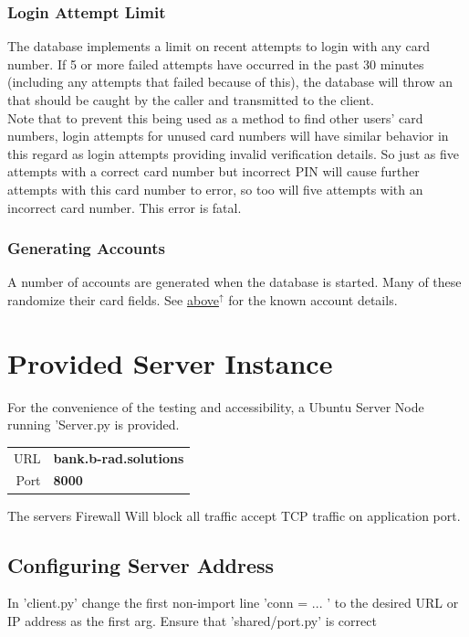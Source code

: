 \documentclass{article}
\newcommand{\code}[1]{\tcbox[
    on line,
    colback=codebackground, boxsep=2pt,
    colframe=white, boxrule=0pt,
    top=0pt, bottom=0pt, left=0pt, right=0pt
]{\texttt{#1}}}
\begin{document}
\subsubsection{Login Attempt Limit}
\label{sec:CardLoginAttemptLimit}
The database implements a limit on recent attempts to login with any card number.
If 5 or more failed attempts have occurred in the past 30 minutes (including any attempts that failed because of this),
the database will throw an \code{AttemptsExceededError} that should be caught by the caller and transmitted to the client. \\
Note that to prevent this being used as a method to find other users' card numbers, login attempts for
unused card numbers will have similar behavior in this regard as login attempts providing invalid verification details.
So just as five attempts with a correct card number but incorrect PIN will cause further attempts with this card number to error,
so too will five attempts with an incorrect card number. This error is fatal.

\subsubsection{Generating Accounts}
A number of accounts are generated when the database is started.
Many of these randomize their card fields.
See \hyperref[sec:ProvidedAccounts]{above$^\uparrow$} for the known account details.

\newpage
\section{Provided Server Instance}
For the convenience of the testing and accessibility, a Ubuntu Server Node running 'Server.py is provided.
\begin{center}
    \begin{tabular}{r|l}
        URL  & \textbf{bank.b-rad.solutions} \\
        Port & \textbf{8000}                 \\
    \end{tabular}
\end{center}
The servers Firewall Will block all traffic accept TCP traffic on application port.

\subsection{Configuring Server Address}
In 'client.py' change the first non-import line 'conn = ... ' to the desired URL or IP address as the first arg. Ensure that 'shared/port.py' is correct
\end{document}
